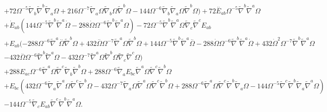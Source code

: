\documentclass[10pt,letterpaper]{article}
\numberwithin{equation}{section}
\begin{document}
\begin{eqnarray}
&& + 72 \Omega^{-5} \tilde{\nabla}_{b}\tilde{\nabla}^{b}\tilde{\nabla}_{a}\Omega + 216 \Omega^{-7} \tilde{\nabla}_{a}\Omega \tilde{\nabla}_{b}\Omega \tilde{\nabla}^{b}\Omega - 144 \Omega^{-6} \tilde{\nabla}_{b}\tilde{\nabla}_{a}\Omega \tilde{\nabla}^{b}\Omega)+72 \overset{..}{E}_{ab} \Omega^{-5} \tilde{\nabla}^{b}\tilde{\nabla}^{a}\Omega \nonumber \\ 
&& + \dot{E}_{ab} (144 \Omega^{-5} \tilde{\nabla}^{b}\tilde{\nabla}^{a}\dot{\Omega} - 288 \dot{\Omega} \Omega^{-6} \tilde{\nabla}^{b}\tilde{\nabla}^{a}\Omega) - 72 \Omega^{-5} \tilde{\nabla}^{b}\tilde{\nabla}^{a}\Omega \tilde{\nabla}_{c}\tilde{\nabla}^{c}E_{ab} \nonumber \\ 
&& + E_{ab} (-288 \Omega^{-6} \tilde{\nabla}^{a}\overset{..}{\Omega} \tilde{\nabla}^{b}\Omega + 432 \overset{..}{\Omega} \Omega^{-7} \tilde{\nabla}^{a}\Omega \tilde{\nabla}^{b}\Omega + 144 \Omega^{-5} \tilde{\nabla}^{b}\tilde{\nabla}^{a}\overset{..}{\Omega} - 288 \dot{\Omega} \Omega^{-6} \tilde{\nabla}^{b}\tilde{\nabla}^{a}\dot{\Omega} + 432 \dot{\Omega}^2 \Omega^{-7} \tilde{\nabla}^{b}\tilde{\nabla}^{a}\Omega \nonumber\\
&&- 432 \overset{..}{\Omega} \Omega^{-6} \tilde{\nabla}^{b}\tilde{\nabla}^{a}\Omega - 432 \Omega^{-7} \tilde{\nabla}^{a}\Omega \tilde{\nabla}^{b}\Omega \tilde{\nabla}_{c}\tilde{\nabla}^{c}\Omega) \nonumber \\ 
&& + 288 E_{ac} \Omega^{-6} \tilde{\nabla}^{a}\Omega \tilde{\nabla}^{c}\tilde{\nabla}_{b}\tilde{\nabla}^{b}\Omega + 288 \Omega^{-6} \tilde{\nabla}_{a}E_{bc} \tilde{\nabla}^{a}\Omega \tilde{\nabla}^{c}\tilde{\nabla}^{b}\Omega \nonumber \\ 
&& + E_{bc} (432 \Omega^{-6} \tilde{\nabla}_{a}\tilde{\nabla}^{a}\Omega \tilde{\nabla}^{c}\tilde{\nabla}^{b}\Omega - 432 \Omega^{-7} \tilde{\nabla}_{a}\Omega \tilde{\nabla}^{a}\Omega \tilde{\nabla}^{c}\tilde{\nabla}^{b}\Omega + 288 \Omega^{-6} \tilde{\nabla}^{a}\Omega \tilde{\nabla}^{c}\tilde{\nabla}^{b}\tilde{\nabla}_{a}\Omega - 144 \Omega^{-5} \tilde{\nabla}^{c}\tilde{\nabla}^{b}\tilde{\nabla}_{a}\tilde{\nabla}^{a}\Omega) \nonumber \\ 
&& - 144 \Omega^{-5} \tilde{\nabla}_{c}E_{ab} \tilde{\nabla}^{c}\tilde{\nabla}^{b}\tilde{\nabla}^{a}\Omega.
\label{dw1tr}
\end{eqnarray}
\end{document}
